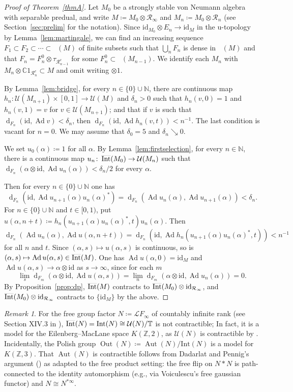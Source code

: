 \documentclass[12pt,nosumlimits,nonamelimits]{amsart}
\theoremstyle{remark}
\newtheorem{rem}[thm]{Remark}
\newcommand{\IC}{\mathbb{C}}
\newcommand{\IN}{\mathbb{N}}
\newcommand{\IT}{\mathbb{T}}
\newcommand{\IZ}{\mathbb{Z}}
\newcommand{\cL}{\mathcal{L}}
\newcommand{\cR}{\mathcal{R}}
\newcommand{\cU}{\mathcal{U}}
\newcommand{\id}{\mathrm{id}}
\DeclareMathOperator{\Aut}{Aut}
\DeclareMathOperator{\Int}{\smash{\overline{\mathrm{Int}}}}
\DeclareMathOperator{\Out}{Out}
\DeclareMathOperator{\Ad}{Ad}
\newcommand{\ns}{\mathop{\mathcal{S}_{\mathrm{n}}}}
\DeclareMathOperator{\dist}{d}
\begin{document}
\begin{proof}[Proof of Theorem~\ref{thmA}]
Let $M_0$ be a strongly stable von Neumann algebra 
with separable predual, and write 
$M\coloneqq M_0\otimes\cR_\infty$ and 
$M_n\coloneqq M_0\otimes\cR_n$ (see Section~\ref{sec:prelim} 
for the notation). 
Since $\id_{M_0}\otimes E_n\to\id_M$ in the u-topo\-logy
by Lemma~\ref{lem:martingale}, 
we can find an increasing sequence 
$F_1\subset F_2\subset\cdots\subset \ns(M)$ 
of finite subsets such that 
$\bigcup_n F_n$ is dense in $\ns(M)$ and that 
$F_n=F_n^0\otimes\tau_{\cR_{n-1}^{\mathrm{c}}}$ 
for some $F_n^0\subset \ns(M_{n-1})$. 
We identify each $M_n$ with $M_n\otimes\IC1_{\cR_n^{\mathrm{c}}}\subset M$ 
and omit writing $\otimes 1$. 

By Lemma~\ref{lem:bridge},
for every $n\in\{0\}\cup\IN$, there are 
continuous map $h_n\colon \cU(M_{n+1})\times[0,1]\to\cU(M)$ 
and $\delta_n>0$ such that 
$h_n(v,0)=1$ and $h_n(v,1)=v$ for $v\in\cU(M_{n+1})$; 
and that if $v$ is such that $\dist_{F_n}(\id,\Ad v)<\delta_n$, 
then $\dist_{F_n}(\id,\Ad h_n(v,t))<n^{-1}$. 
The last condition is vacant for $n=0$. 
We may assume that $\delta_0=5$ and $\delta_n\searrow0$. 

We set $u_0(\alpha) \coloneqq 1$ for all $\alpha$. 
By Lemma~\ref{lem:firstselection},
for every $n\in\IN$, there is 
a continuous map $u_n\colon \Int(M_0)\to \cU(M_n)$
such that 
$\dist_{F_n}(\alpha\otimes\id,\Ad u_n(\alpha))<\delta_n/2$ for 
every $\alpha$.  

Then for every $n\in\{0\}\cup\IN$ one has 
\[
\dist_{F_n}(\id,\Ad u_{n+1}(\alpha)u_n(\alpha)^*)
 =\dist_{F_n}(\Ad u_n(\alpha),\Ad u_{n+1}(\alpha))
 <\delta_n.
\]
For $n\in\{0\}\cup\IN$ and $t\in[0,1)$, put 
$u(\alpha,n+t)\coloneqq h_n(u_{n+1}(\alpha)u_n(\alpha)^*,t)u_n(\alpha)$.
Then 
\[
\dist_{F_n}(\Ad u_n(\alpha), \Ad u(\alpha,n+t))
=\dist_{F_n}(\id, \Ad h_n(u_{n+1}(\alpha)u_n(\alpha)^*,t))<n^{-1}
\]
for all $n$ and $t$. 
Since $(\alpha,s)\mapsto u(\alpha,s)$ is continuous, so is 
$(\alpha,s)\mapsto\Ad u(\alpha,s)\in\Int(M)$. 
One has $\Ad u(\alpha,0)=\id_M$ and 
$\Ad u(\alpha,s)\to\alpha\otimes\id$ as $s\to\infty$, 
since for each $m$ 
\[
\lim_s \dist_{F_m}(\alpha\otimes\id,\Ad u(\alpha,s)) 
= \lim_n \dist_{F_m}(\alpha\otimes\id,\Ad u_n(\alpha)) = 0.
\]
By Proposition~\ref{prop:dp}, $\Int(M)$ contracts to 
$\Int(M_0)\otimes\id_{\cR_\infty}$, 
and $\Int(M_0)\otimes\id_{\cR_\infty}$ contracts 
to $\{\id_M\}$ by the above. 
\end{proof}
%
\begin{rem}
For the free group factor $N\coloneqq\cL F_\infty$ 
of countably infinite rank (see Section XIV.3 in \cite{takesakiIII}), 
$\Int(N)=\mathrm{Int}(N)\cong\cU(N)/\IT$ is not contractible; 
In fact, it is a model for the Eilenberg–MacLane 
space $K(\IZ,2)$, as $\cU(N)$ is contractible 
by \cite{pt}. 
Incidentally, the Polish group 
$\Out(N)\coloneqq\Aut(N)/\mathrm{Int}(N)$ 
is a model for $K(\IZ,3)$. 
That $\Aut(N)$ is contractible follows from 
Dadarlat and Pennig's argument (\cite{dp}) 
as adapted to the free product setting: 
the free flip on $N*N$ is path-connected 
to the identity automorphism 
(e.g., via Voiculescu's free gaussian functor) 
and $N\cong N^{\ast\infty}$. 
\end{rem}
\end{document}
